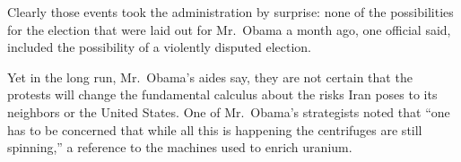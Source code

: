 ﻿\documentclass[12pt,a4paper,onecolumn]{article}
\begin{document}
Clearly those events took the administration by surprise: none of the possibilities for the election
that were laid out for Mr.~Obama a month ago, one official said, included the possibility of a
violently disputed election.

Yet in the long run, Mr.~Obama's aides say, they are not certain that the protests will change the
fundamental calculus about the risks Iran poses to its neighbors or the United States. One of
Mr.~Obama's strategists noted that ``one has to be concerned that while all this is happening the
centrifuges are still spinning,'' a reference to the machines used to enrich uranium.
\end{document}

